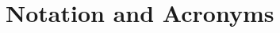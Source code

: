 \documentclass[ %
                    author={Tom Jager},
                supervisor={Dr. Daniel Schien},
                    degree={MEng},
                     title={A Bayesian Inference Engine for Calibrating Uncertainty over UMIS Structured MFA Systems},
                  subtitle={},
                      type={research},
                      year={2019} ]{dissertation}
\begin{document}

\chapter*{Notation and Acronyms}
\end{document}
